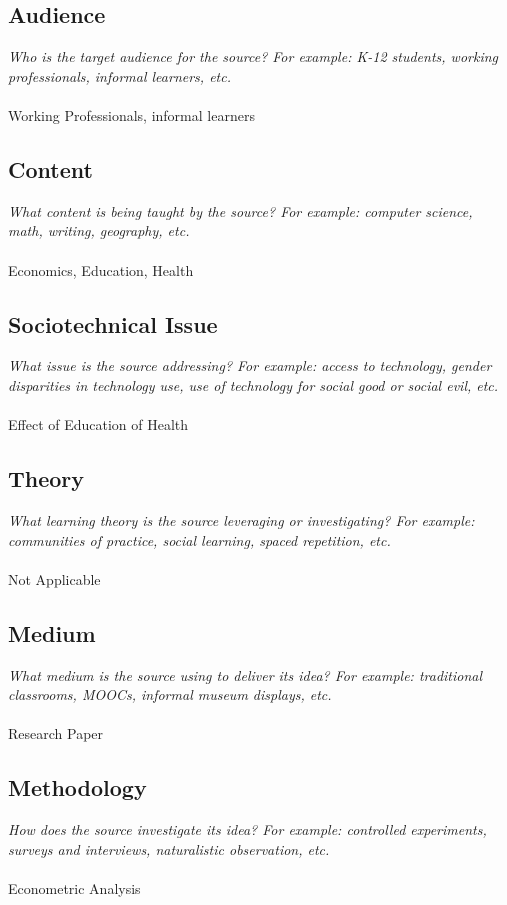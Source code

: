 \documentclass[12pt, final]{article}
\begin{document}
\subsection{Audience}
\textit{Who is the target audience for the source? For example: K-12 students, working professionals, informal learners, etc.}
\\
\\
Working Professionals, informal learners

\subsection{Content}
\textit{What content is being taught by the source? For example: computer science, math, writing, geography, etc.}
\\
\\
Economics, Education, Health

\subsection{Sociotechnical Issue}
\textit{What issue is the source addressing? For example: access to technology, gender disparities in technology use, use of technology for social good or social evil, etc.}
\\
\\
Effect of Education of Health

\subsection{Theory}
\textit{What learning theory is the source leveraging or investigating? For example: communities of practice, social learning, spaced repetition, etc.}
\\
\\
Not Applicable

\subsection{Medium}
\textit{What medium is the source using to deliver its idea? For example: traditional classrooms, MOOCs, informal museum displays, etc.}
\\
\\
Research Paper

\subsection{Methodology}
\textit{How does the source investigate its idea? For example: controlled experiments, surveys and interviews, naturalistic observation, etc.}
\\
\\
Econometric Analysis
\end{document}
